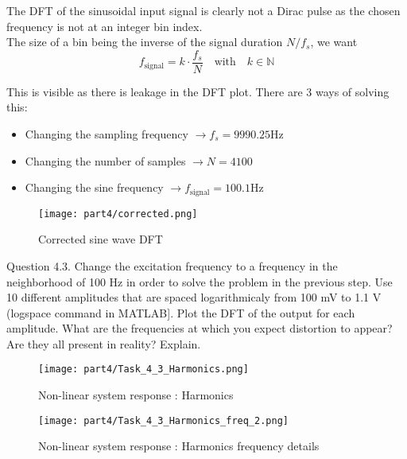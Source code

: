 The DFT of the sinusoidal input signal is clearly not a Dirac pulse as the chosen frequency is not at an integer bin index. \\

The size of a bin being the inverse of the signal duration $N/f_s$, we want
\begin{equation*}
    f_{\text{signal}} = k \cdot \frac{f_s}{N} \quad \text{with} \quad k \in \mathbb{N}
\end{equation*}

This is visible as there is leakage in the DFT plot. There are 3 ways of solving this:
\begin{itemize}
    \item Changing the sampling frequency $\rightarrow f_s = 9990.25 \text{Hz}$
    \item Changing the number of samples $\rightarrow N = 4100 $
    \item Changing the sine frequency $\rightarrow f_{\text{signal}} = 100.1 \text{Hz}$
\end{itemize}

\begin{figure}[H]
    \centering
    \texttt{[image: part4/corrected.png]}
    \caption{Corrected sine wave DFT}
    \label{fig:corrected}
\end{figure}


\begin{Task}{Question 4.3.}
    Change the excitation frequency to a frequency in the neighborhood of 100 Hz in order to solve the problem in the previous step. Use 10 different amplitudes that are spaced logarithmicaly from 100 mV to 1.1 V (logspace command in MATLAB]. Plot the DFT of the output for each amplitude. What are the frequencies at which you expect distortion to appear? Are they all present in reality? Explain.
\end{Task}

\begin{figure}[H]
    \centering
    \texttt{[image: part4/Task\_4\_3\_Harmonics.png]}
    \caption{Non-linear system response : Harmonics}
    \label{fig:Harmonics}
\end{figure}

\begin{figure}[H]
    \centering
    \texttt{[image: part4/Task\_4\_3\_Harmonics\_freq\_2.png]}
    \caption{Non-linear system response : Harmonics frequency details}
    \label{fig:Harmonics frequencies value}
\end{figure}

